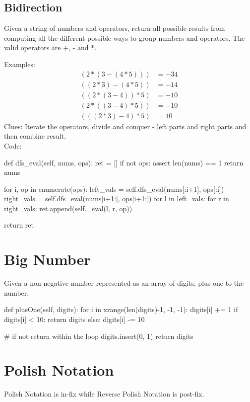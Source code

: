 \subsection{Bidirection}
 Given a string of numbers and operators, return all possible results from computing all the different possible ways to group numbers and operators. The valid operators are +, - and *.

Examples:
\begin{align*}
(2*(3-(4*5))) &= -34 \\
((2*3)-(4*5)) &= -14 \\
((2*(3-4))*5) &= -10 \\
(2*((3-4)*5)) &= -10 \\
(((2*3)-4)*5) &= 10
\end{align*}
Clues: Iterate the operators, divide and conquer - left parts and right parts and then combine result. \\
Code:
\begin{python}
def dfs_eval(self, nums, ops):
    ret = []
    if not ops:
        assert len(nums) == 1
        return nums

    for i, op in enumerate(ops):
        left_vals = self.dfs_eval(nums[:i+1], ops[:i])
        right_vals = self.dfs_eval(nums[i+1:], ops[i+1:])
        for l in left_vals:
            for r in right_vals:
                ret.append(self._eval(l, r, op))

    return ret
\end{python}

\section{Big Number}
 Given a non-negative number represented as an array of digits, plus one to the number.
\begin{python}
def plusOne(self, digits):
    for i in xrange(len(digits)-1, -1, -1):
        digits[i] += 1
        if digits[i] < 10:
            return digits
        else:
            digits[i] -= 10

    # if not return within the loop 
    digits.insert(0, 1)
    return digits
\end{python}

\section{Polish Notation}
Polish Notation is in-fix while Reverse Polish Notation is post-fix. 

